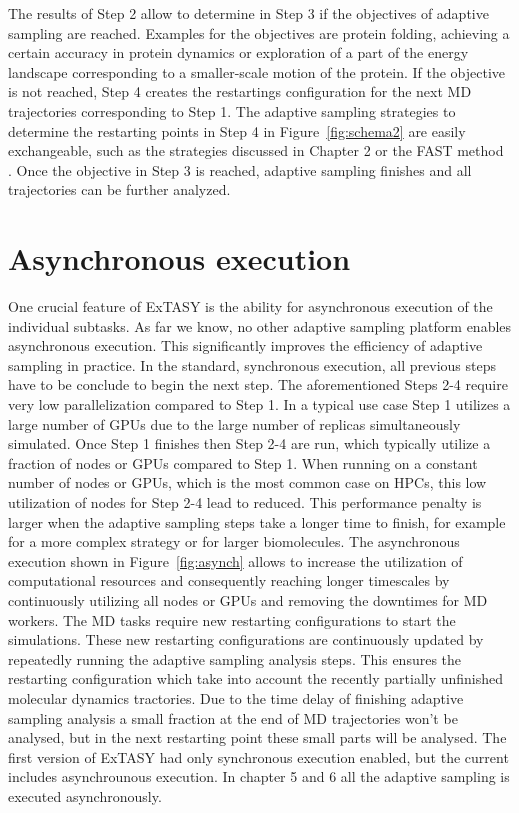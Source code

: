 {The results of Step 2 allow to determine in Step 3 if the objectives of adaptive sampling are reached. Examples for the objectives are protein folding, achieving a certain accuracy in protein dynamics or exploration of a part of the energy landscape corresponding to a smaller-scale motion of the protein. If the objective is not reached, Step 4 creates the restartings configuration for the next MD trajectories corresponding to Step 1. The adaptive sampling strategies to determine the restarting points in Step 4 in Figure~\ref{fig:schema2} are easily exchangeable, such as the strategies discussed in Chapter 2 or the FAST method \cite{FAST}. Once the objective in Step 3 is reached, adaptive sampling finishes and all trajectories can be further analyzed. 

\section{\label{sec:asynch}Asynchronous execution}

One crucial feature of ExTASY is the ability for asynchronous execution of the individual subtasks. As far we know, no other adaptive sampling platform enables asynchronous execution. This significantly improves the efficiency of adaptive sampling in practice. In the standard, synchronous execution, all previous steps have to be conclude to begin the next step. 
The aforementioned Steps 2-4 require very low parallelization compared to Step 1. In a typical use case Step 1 utilizes a large number of GPUs due to the large number of replicas simultaneously simulated. Once Step 1 finishes then Step 2-4 are run, which typically utilize a fraction of nodes or GPUs compared to Step 1. When running on a constant number of nodes or GPUs, which is the most common case on HPCs, this low utilization of nodes for Step 2-4 lead to reduced. This performance penalty is larger when the adaptive sampling steps take a longer time to finish, for example for a more complex strategy or for larger biomolecules. The asynchronous execution shown in Figure~\ref{fig:asynch} allows to increase the utilization of computational resources and consequently reaching longer timescales by continuously utilizing all nodes or GPUs and removing the downtimes for MD workers. The MD tasks require new restarting configurations to start the simulations. These new restarting configurations are continuously updated by repeatedly running the adaptive sampling analysis steps. This ensures the restarting configuration which take into account the recently partially unfinished molecular dynamics tractories. Due to the time delay of finishing adaptive sampling analysis a small fraction at the end of MD trajectories won't be analysed, but in the next restarting point these small parts will be analysed.
The first version of ExTASY\cite{Extasy2016} had only synchronous execution enabled, but the current \cite{Extasy2019} includes asynchrounous execution. In chapter 5 and 6 all the adaptive sampling is executed asynchronously. 

}
